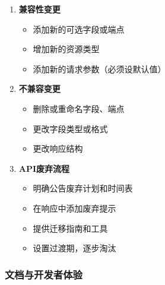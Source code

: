 \begin{enumerate}
\def\labelenumi{\arabic{enumi}.}
\tightlist
\item
  \textbf{兼容性变更}

  \begin{itemize}
  \tightlist
  \item
    添加新的可选字段或端点
  \item
    增加新的资源类型
  \item
    添加新的请求参数（必须设默认值）
  \end{itemize}
\item
  \textbf{不兼容变更}

  \begin{itemize}
  \tightlist
  \item
    删除或重命名字段、端点
  \item
    更改字段类型或格式
  \item
    更改响应结构
  \end{itemize}
\item
  \textbf{API废弃流程}

  \begin{itemize}
  \tightlist
  \item
    明确公告废弃计划和时间表
  \item
    在响应中添加废弃提示
  \item
    提供迁移指南和工具
  \item
    设置过渡期，逐步淘汰
  \end{itemize}
\end{enumerate}

\subsubsection{文档与开发者体验}\label{ux6587ux6863ux4e0eux5f00ux53d1ux8005ux4f53ux9a8c}

